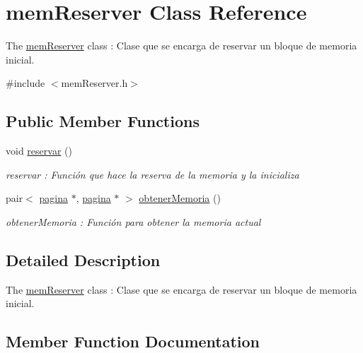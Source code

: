 \hypertarget{classmem_reserver}{}\section{mem\+Reserver Class Reference}
\label{classmem_reserver}


The \hyperlink{classmem_reserver}{mem\+Reserver} class \+: Clase que se encarga de reservar un bloque de memoria inicial.  




{\ttfamily \#include $<$mem\+Reserver.\+h$>$}

\subsection*{Public Member Functions}
\begin{DoxyCompactItemize}
\item 
void \hyperlink{classmem_reserver_a7969fa416646d9d2191cc6d941a84c63}{reservar} ()\hypertarget{classmem_reserver_a7969fa416646d9d2191cc6d941a84c63}{}\label{classmem_reserver_a7969fa416646d9d2191cc6d941a84c63}

\begin{DoxyCompactList}\small\item\em reservar \+: Función que hace la reserva de la memoria y la inicializa \end{DoxyCompactList}\item 
pair$<$ \hyperlink{classpagina}{pagina} $\ast$, \hyperlink{classpagina}{pagina} $\ast$ $>$ \hyperlink{classmem_reserver_af22c2308ae39dedde54b41f900318114}{obtener\+Memoria} ()
\begin{DoxyCompactList}\small\item\em obtener\+Memoria \+: Función para obtener la memoria actual \end{DoxyCompactList}\end{DoxyCompactItemize}


\subsection{Detailed Description}
The \hyperlink{classmem_reserver}{mem\+Reserver} class \+: Clase que se encarga de reservar un bloque de memoria inicial. 

\subsection{Member Function Documentation}
